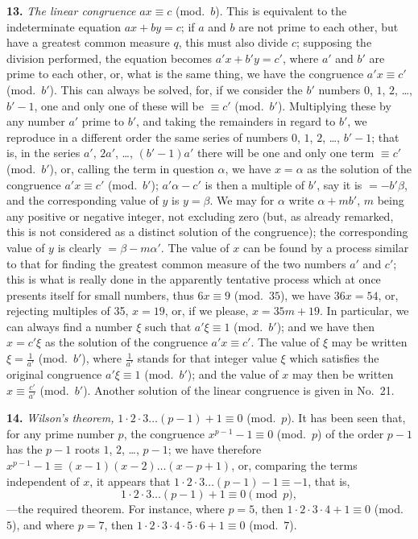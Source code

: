 \documentclass[11pt,a4paper]{article}
\begin{document}
\textbf{13.}\quad
\textit{The linear congruence} $ax \equiv c$ (mod.\ $b$). This is equivalent to the indeterminate equation $ax + by = c$; if $a$ and $b$ are not prime to each other, but have a greatest common measure $q$, this must also divide $c$; supposing the division performed, the equation becomes $a'x + b'y = c'$, where $a'$ and $b'$ are prime to each other, or, what is the same thing, we have the congruence $a'x \equiv c'$ (mod.\ $b'$). This can always be solved, for, if we consider the $b'$ numbers $0$, $1$, $2$, \ldots, $b' - 1$, one and only one of these will be $\equiv c'$ (mod.\ $b'$). Multiplying these by any number $a'$ prime to $b'$, and taking the remainders in regard to $b'$, we reproduce in a different order the same series of numbers $0$, $1$, $2$, \ldots, $b' - 1$; that is, in the series $a'$, $2a'$, \ldots, $(b' - 1)a'$ there will be one and only one term $\equiv c'$ (mod.\ $b'$), or, calling the term in question $\alpha$, we have $x = \alpha$ as the solution of the congruence $a'x \equiv c'$ (mod.\ $b'$); $a'\alpha - c'$ is then a multiple of $b'$, say it is $= -b'\beta$, and the corresponding value of $y$ is $y = \beta$. We may for $\alpha$ write $\alpha + mb'$, $m$ being any positive or negative integer, not excluding zero (but, as already remarked, this is not considered as a distinct solution of the congruence); the corresponding value of $y$ is clearly $= \beta - m\alpha'$. The value of $x$ can be found by a process similar to that for finding the greatest common measure of the two numbers $a'$ and $c'$; this is what is really done in the apparently tentative process which at once presents itself for small numbers, thus $6x \equiv 9$ (mod.\ $35$), we have $36x = 54$, or, rejecting multiples of 35, $x = 19$, or, if we please, $x = 35m + 19$. In particular, we can always find a number $\xi$ such that $a'\xi \equiv 1$ (mod.\ $b'$); and we have then $x = c'\xi$ as the solution of the congruence $a'x \equiv c'$. The value of $\xi$ may be written $\xi = \frac{1}{a'}$ (mod.\ $b'$), where $\frac{1}{a'}$ stands for that integer value $\xi$ which satisfies the original congruence $a'\xi \equiv 1$ (mod.\ $b'$); and the value of $x$ may then be written $x \equiv \frac{c'}{a'}$ (mod.\ $b'$). Another solution of the linear congruence is given in No.~21.

\textbf{14.}\quad
\textit{Wilson's theorem,} $1 \cdot 2 \cdot 3 \ldots (p - 1) + 1 \equiv 0$ (mod.\ $p$). It has been seen that, for any prime number $p$, the congruence $x^{p-1} - 1 \equiv 0$ (mod.\ $p$) of the order $p - 1$ has the $p - 1$ roots $1$, $2$, \ldots, $p - 1$; we have therefore $x^{p-1} - 1 \equiv (x - 1)(x - 2) \ldots (x - p + 1)$, or, comparing the terms independent of $x$, it appears that $1 \cdot 2 \cdot 3 \ldots (p - 1) - 1 \equiv -1$, that is,
\[
1 \cdot 2 \cdot 3 \ldots (p - 1) + 1 \equiv 0 \pmod{p},
\]
---the required theorem. For instance, where $p = 5$, then $1 \cdot 2 \cdot 3 \cdot 4 + 1 \equiv 0$ (mod.\ $5$), and where $p = 7$, then $1 \cdot 2 \cdot 3 \cdot 4 \cdot 5 \cdot 6 + 1 \equiv 0$ (mod.\ $7$).
\end{document}
